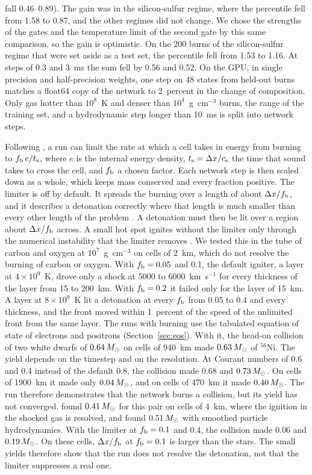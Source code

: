 \documentclass[twocolumn]{aastex701}
\begin{document}
fall 0.46--0.89). The gain was in the silicon-sulfur regime, where the percentile fell from 1.58 to 0.87, and the other regimes did not change. We chose the strengths of the gates and the temperature limit of the second gate by this same comparison, so the gain is optimistic. On the 200 burns of the silicon-sulfur regime that were set aside as a test set, the percentile fell from 1.53 to 1.16. At steps of 0.3 and 3~ms the sum fell by 0.56 and 0.52. On the GPU, in single precision and half-precision weights, one step on 48 states from held-out burns matches a float64 copy of the network to 2~percent in the change of composition. Only gas hotter than $10^8$~K and denser than $10^4$~g~cm$^{-3}$ burns, the range of the training set, and a hydrodynamic step longer than 10~ms is split into network steps.

Following \citet{Kushnir2013}, a run can limit the rate at which a cell takes in energy from burning to $f_{\rm b}\,e/t_{\rm s}$, where $e$ is the internal energy density, $t_{\rm s} = \Delta x/c_{\rm s}$ the time that sound takes to cross the cell, and $f_{\rm b}$ a chosen factor. Each network step is then scaled down as a whole, which keeps mass conserved and every fraction positive. The limiter is off by default. It spreads the burning over a length of about $\Delta x/f_{\rm b}$, and it describes a detonation correctly where that length is much smaller than every other length of the problem \citep{KushnirKatz2020}. A detonation must then be lit over a region about $\Delta x/f_{\rm b}$ across. A small hot spot ignites without the limiter only through the numerical instability that the limiter removes \citep{Kushnir2020}. We tested this in the tube of carbon and oxygen at $10^7$~g~cm$^{-3}$ on cells of 2~km, which do not resolve the burning of carbon or oxygen. With $f_{\rm b} = 0.05$ and 0.1, the default igniter, a layer at $4\times10^9$~K, drove only a shock at 5000 to 6000~km~s$^{-1}$ for every thickness of the layer from 15 to 200~km. With $f_{\rm b} = 0.2$ it failed only for the layer of 15~km. A layer at $8\times10^9$~K lit a detonation at every $f_{\rm b}$ from 0.05 to 0.4 and every thickness, and the front moved within 1~percent of the speed of the unlimited front from the same layer. The runs with burning use the tabulated equation of state of electrons and positrons (Section~\ref{sec:eos}). With it, the head-on collision of two white dwarfs of $0.64\,M_\odot$ on cells of 940~km made $0.63\,M_\odot$ of $^{56}$Ni. The yield depends on the timestep and on the resolution. At Courant numbers of 0.6 and 0.4 instead of the default 0.8, the collision made 0.68 and $0.73\,M_\odot$. On cells of 1900~km it made only $0.04\,M_\odot$, and on cells of 470~km it made $0.40\,M_\odot$. The run therefore demonstrates that the network burns a collision, but its yield has not converged. \citet{Kushnir2013} found $0.41\,M_\odot$ for this pair on cells of 4~km, where the ignition in the shocked gas is resolved, and \citet{Raskin2010} found $0.51\,M_\odot$ with smoothed particle hydrodynamics. With the limiter at $f_{\rm b} = 0.1$ and 0.4, the collision made 0.06 and $0.19\,M_\odot$. On these cells, $\Delta x/f_{\rm b}$ at $f_{\rm b} = 0.1$ is larger than the stars. The small yields therefore show that the run does not resolve the detonation, not that the limiter suppresses a real one.
\end{document}
